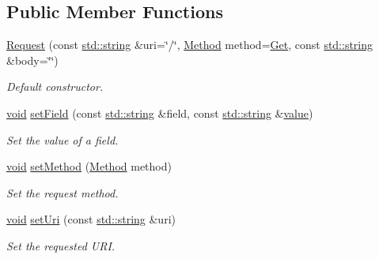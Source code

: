 \subsection*{Public Member Functions}
\begin{DoxyCompactItemize}
\item 
\hyperlink{classsf_1_1_http_1_1_request_a8e89d9e8ffcc1163259b35d79809a61c}{Request} (const \hyperlink{gl3_8h_ac83513893df92266f79a515488701770}{std\-::string} \&uri=\char`\"{}/\char`\"{}, \hyperlink{classsf_1_1_http_1_1_request_a620f8bff6f43e1378f321bf53fbf5598}{Method} method=\hyperlink{classsf_1_1_http_1_1_request_a620f8bff6f43e1378f321bf53fbf5598ab822baed393f3d0353621e5378b9fcb4}{Get}, const \hyperlink{gl3_8h_ac83513893df92266f79a515488701770}{std\-::string} \&body=\char`\"{}\char`\"{})
\begin{DoxyCompactList}\small\item\em Default constructor. \end{DoxyCompactList}\item 
\hyperlink{glutf90_8h_ac778d6f63f1aaf8ebda0ce6ac821b56e}{void} \hyperlink{classsf_1_1_http_1_1_request_aea672fae5dd089f4b6b3745ed46210d2}{set\-Field} (const \hyperlink{gl3_8h_ac83513893df92266f79a515488701770}{std\-::string} \&field, const \hyperlink{gl3_8h_ac83513893df92266f79a515488701770}{std\-::string} \&\hyperlink{gl3_8h_a8ad81492d410ff2ac11f754f4042150f}{value})
\begin{DoxyCompactList}\small\item\em Set the value of a field. \end{DoxyCompactList}\item 
\hyperlink{glutf90_8h_ac778d6f63f1aaf8ebda0ce6ac821b56e}{void} \hyperlink{classsf_1_1_http_1_1_request_abab148554e873e80d2e41376fde1cb62}{set\-Method} (\hyperlink{classsf_1_1_http_1_1_request_a620f8bff6f43e1378f321bf53fbf5598}{Method} method)
\begin{DoxyCompactList}\small\item\em Set the request method. \end{DoxyCompactList}\item 
\hyperlink{glutf90_8h_ac778d6f63f1aaf8ebda0ce6ac821b56e}{void} \hyperlink{classsf_1_1_http_1_1_request_a3723de4b4f1a14b744477841c4ac22e6}{set\-Uri} (const \hyperlink{gl3_8h_ac83513893df92266f79a515488701770}{std\-::string} \&uri)
\begin{DoxyCompactList}\small\item\em Set the requested U\-R\-I. \end{DoxyCompactList}\item 

\end{DoxyCompactItemize}
